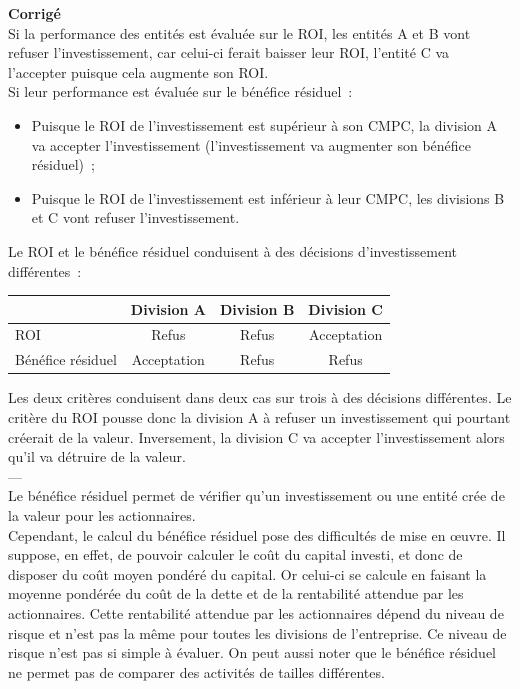 \documentclass{kaobook}
\begin{document}
\textbf{Corrigé}\\
Si la performance des entités est évaluée sur le ROI, les entités A et B vont refuser l'investissement, car celui-ci ferait baisser leur ROI, l'entité C va l'accepter puisque cela augmente son ROI.\\
Si leur performance est évaluée sur le bénéfice résiduel :\\
\begin{itemize}
\item Puisque le ROI de l'investissement est supérieur à son CMPC, la division A va accepter l'investissement (l'investissement va augmenter son bénéfice résiduel) ;\\
\item Puisque le ROI de l'investissement est inférieur à leur CMPC, les divisions B et C vont refuser l'investissement.\\
\end{itemize}
Le ROI et le bénéfice résiduel conduisent à des décisions d'investissement différentes :\\
\begin{center}
\begin{tabular}{l c c c}
 & Division A & Division B & Division C\\
\hline
ROI & Refus & Refus & Acceptation\\
Bénéfice résiduel & Acceptation & Refus & Refus\\
\end{tabular}
\end{center}
Les deux critères conduisent dans deux cas sur trois à des décisions différentes. Le critère du ROI pousse donc la division A à refuser un investissement qui pourtant créerait de la valeur. Inversement, la division C va accepter l'investissement alors qu'il va détruire de la valeur.\\
---\\

Le bénéfice résiduel permet de vérifier qu'un investissement ou une entité crée de la valeur pour les actionnaires.\\

Cependant, le calcul du bénéfice résiduel pose des difficultés de mise en œuvre. Il suppose, en effet, de pouvoir calculer le coût du capital investi, et donc de disposer du coût moyen pondéré du capital. Or celui-ci se calcule en faisant la moyenne pondérée du coût de la dette et de la rentabilité attendue par les actionnaires. Cette rentabilité attendue par les actionnaires dépend du niveau de risque et n'est pas la même pour toutes les divisions de l'entreprise. Ce niveau de risque n'est pas si simple à évaluer. On peut aussi noter que le bénéfice résiduel ne permet pas de comparer des activités de tailles différentes.\\
\end{document}
